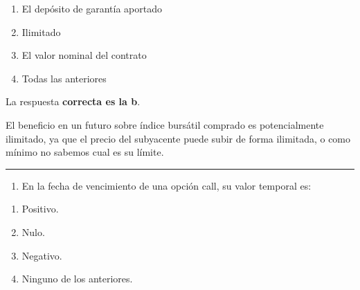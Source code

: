 \documentclass[
  letterpaper,
  DIV=11,
  numbers=noendperiod]{scrreprt}
\providecommand{\tightlist}{%
  \setlength{\itemsep}{0pt}\setlength{\parskip}{0pt}}\usepackage{longtable,booktabs,array}
\begin{document}
\begin{enumerate}
\def\labelenumi{\alph{enumi})}
\item
  El depósito de garantía aportado
\item
  Ilimitado
\item
  El valor nominal del contrato
\item
  Todas las anteriores
\end{enumerate}

\begin{tcolorbox}[enhanced jigsaw, left=2mm, opacityback=0, colback=white, breakable, arc=.35mm, bottomrule=.15mm, rightrule=.15mm, toprule=.15mm, leftrule=.75mm, colframe=quarto-callout-tip-color-frame]
\begin{minipage}[t]{5.5mm}
\textcolor{quarto-callout-tip-color}{\faLightbulb}
\end{minipage}%
\begin{minipage}[t]{\textwidth - 5.5mm}

La respuesta \textbf{correcta es la b}.

El beneficio en un futuro sobre índice bursátil comprado es
potencialmente ilimitado, ya que el precio del subyacente puede subir de
forma ilimitada, o como mínimo no sabemos cual es su límite.

\end{minipage}%
\end{tcolorbox}

\begin{center}\rule{0.5\linewidth}{0.5pt}\end{center}

\begin{enumerate}
\def\labelenumi{\arabic{enumi}.}
\setcounter{enumi}{49}
\tightlist
\item
  En la fecha de vencimiento de una opción call, su valor temporal es:
\end{enumerate}

\begin{enumerate}
\def\labelenumi{\alph{enumi})}
\item
  Positivo.
\item
  Nulo.
\item
  Negativo.
\item
  Ninguno de los anteriores.
\end{enumerate}
\end{document}
